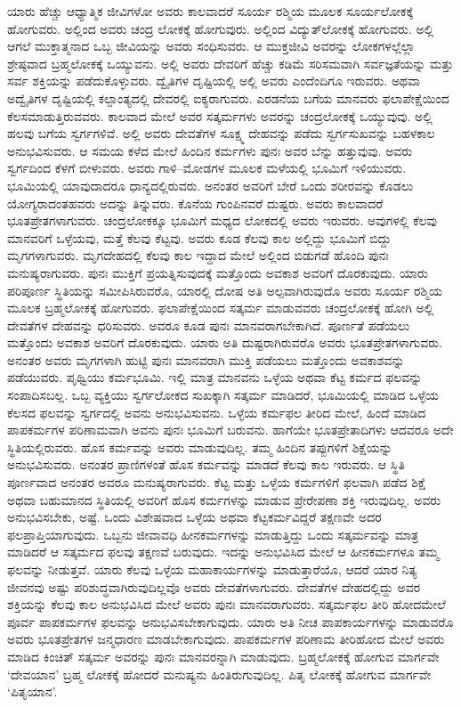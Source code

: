 ಯಾರು ಹೆಚ್ಚು ಆಧ್ಯಾತ್ಮಿಕ ಜೀವಿಗಳೋ ಅವರು ಕಾಲವಾದರೆ ಸೂರ್ಯ ರಶ್ಮಿಯ ಮೂಲಕ ಸೂರ್ಯಲೋಕಕ್ಕೆ ಹೋಗುವರು. ಅಲ್ಲಿಂದ ಅವರು ಚಂದ್ರ ಲೋಕಕ್ಕೆ ಹೋಗುವುರು. ಅಲ್ಲಿಂದ ವಿದ್ಯುತ್​ಲೋಕಕ್ಕೆ ಹೋಗುವರು. ಅಲ್ಲಿ ಆಗಲೆ ಮುಕ್ತಾತ್ಮನಾದ ಒಬ್ಬ ಜೀವಿಯನ್ನು ಅವರು ಸಂಧಿಸುವರು. ಆ ಮುಕ್ತಜೀವಿ ಅವರನ್ನು ಲೋಕಗಳಲ್ಲೆಲ್ಲಾ ಶ್ರೇಷ್ಠವಾದ ಬ್ರಹ್ಮಲೋಕಕ್ಕೆ ಒಯ್ಯುವನು. ಅಲ್ಲಿ ಅವರು ದೇವರಿಗೆ ಹೆಚ್ಚು ಕಡಿಮೆ ಸರಿಸಮವಾಗಿ ಸರ್ವಜ್ಞತೆಯನ್ನು ಮತ್ತು ಸರ್ವ ಶಕ್ತಿಯನ್ನು ಪಡೆದುಕೊಳ್ಳುವರು. ದ್ವೈತಿಗಳ ದೃಷ್ಟಿಯಲ್ಲಿ ಅಲ್ಲಿ ಅವರು ಎಂದೆಂದಿಗೂ ಇರುವರು. ಅಥವಾ ಅದ್ವೈತಿಗಳ ದೃಷ್ಟಿಯಲ್ಲಿ ಕಲ್ಪಾಂತ್ಯದಲ್ಲಿ ದೇವರಲ್ಲಿ ಐಕ್ಯರಾಗುವರು. ಎರಡನೆಯ ಬಗೆಯ ಮಾನವರು ಫಲಾಪೇಕ್ಷೆಯಿಂದ ಕೆಲಸಮಾಡುತ್ತಿರುವವರು. ಕಾಲವಾದ ಮೇಲೆ ಅವರ ಸತ್ಕರ್ಮಗಳು ಅವರನ್ನು ಚಂದ್ರಲೋಕಕ್ಕೆ ಒಯ್ಯುವುವು. ಅಲ್ಲಿ ಹಲವು ಬಗೆಯ ಸ್ವರ್ಗಗಳಿವೆ. ಅಲ್ಲಿ ಅವರು ದೇವತೆಗಳ ಸೂಕ್ಷ್ಮ ದೇಹವನ್ನು ಪಡೆದು ಸ್ವರ್ಗಸುಖವನ್ನು ಬಹಳಕಾಲ ಅನುಭವಿಸುವರು. ಆ ಸಮಯ ಕಳೆದ ಮೇಲೆ ಹಿಂದಿನ ಕರ್ಮಗಳು ಪುನಃ ಅವರ ಬೆನ್ನು ಹತ್ತುವುವು. ಅವರು ಸ್ವರ್ಗದಿಂದ ಕೆಳಗೆ ಬೀಳುವರು. ಅವರು ಗಾಳಿ–ಮೋಡಗಳ ಮೂಲಕ ಮಳೆಯಲ್ಲಿ ಭೂಮಿಗೆ ಇಳಿಯುವರು. ಭೂಮಿಯಲ್ಲಿ ಯಾವುದಾದರೂ ಧಾನ್ಯದಲ್ಲಿರುವರು. ಅನಂತರ ಅವರಿಗೆ ಬೇರೆ ಒಂದು ಶರೀರವನ್ನು ಕೊಡಲು ಯೋಗ್ಯರಾದಂತಹವರು ಅದನ್ನು ತಿನ್ನುವರು. ಕೊನೆಯ ಗುಂಪಿನವರೆ ದುಷ್ಟರು. ಅವರು ಕಾಲವಾದರೆ ಭೂತಪ್ರೇತಗಳಾಗುವರು. ಚಂದ್ರಲೋಕಕ್ಕೂ ಭೂಮಿಗೆ ಮಧ್ಯದ ಲೋಕದಲ್ಲಿ ಅವರು ಇರುವರು. ಅವುಗಳಲ್ಲಿ ಕೆಲವು ಮಾನವರಿಗೆ ಒಳ್ಳೆಯವು, ಮತ್ತೆ ಕೆಲವು ಕೆಟ್ಟವು. ಅವರು ಕೂಡ ಕೆಲವು ಕಾಲ ಅಲ್ಲಿದ್ದು ಭೂಮಿಗೆ ಬಿದ್ದು ಮೃಗಗಳಾಗುವರು. ಮೃಗದೇಹದಲ್ಲಿ ಕೆಲವು ಕಾಲ ಇದ್ದಾದ ಮೇಲೆ ಅಲ್ಲಿಂದ ಬಿಡುಗಡೆ ಹೊಂದಿ ಪುನಃ ಮನುಷ್ಯರಾಗುವರು. ಪುನಃ ಮುಕ್ತಿಗೆ ಪ್ರಯತ್ನಿಸುವುದಕ್ಕೆ ಮತ್ತೊಂದು ಅವಕಾಶ ಅವರಿಗೆ ದೊರಕುವುದು. ಯಾರು ಪರಿಪೂರ್ಣ ಸ್ಥಿತಿಯನ್ನು ಸಮೀಪಿಸಿರುವರೊ, ಯಾರಲ್ಲಿ ದೋಷ ಅತಿ ಅಲ್ಪವಾಗಿರುವುದೊ ಅವರು ಸೂರ್ಯ ರಶ್ಮಿಯ ಮೂಲಕ ಬ್ರಹ್ಮಲೋಕಕ್ಕೆ ಹೋಗುವರು. ಫಲಾಪೇಕ್ಷೆಯಿಂದ ಸತ್ಕರ್ಮ ಮಾಡುವವರು ಚಂದ್ರಲೋಕಕ್ಕೆ ಹೋಗಿ ಅಲ್ಲಿ ದೇವತೆಗಳ ದೇಹವನ್ನು ಧರಿಸುವರು. ಅವರೂ ಕೂಡ ಪುನಃ ಮಾನವರಾಗಬೇಕಾಗಿದೆ. ಪೂರ್ಣತೆ ಪಡೆಯಲು ಮತ್ತೊಂದು ಅವಕಾಶ ಅವರಿಗೆ ದೊರಕುವುದು. ಯಾರು ಅತಿ ದುಷ್ಟರಾಗಿರುವರೊ ಅವರು ಭೂತಪ್ರೇತಗಳಾಗುವರು. ಅನಂತರ ಅವರು ಮೃಗಗಳಾಗಿ ಹುಟ್ಟಿ ಪುನಃ ಮಾನವರಾಗಿ ಮುಕ್ತಿ ಪಡೆಯಲು ಮತ್ತೊಂದು ಅವಕಾಶವನ್ನು ಪಡೆಯುವರು. ಪೃಥ್ವಿಯು ಕರ್ಮಭೂಮಿ. ಇಲ್ಲಿ ಮಾತ್ರ ಮಾನವನು ಒಳ್ಳೆಯ ಅಥವಾ ಕೆಟ್ಟ ಕರ್ಮದ ಫಲವನ್ನು ಸಂಪಾದಿಸಬಲ್ಲ. ಒಬ್ಬ ವ್ಯಕ್ತಿಯು ಸ್ವರ್ಗಲೋಕದ ಸುಖಕ್ಕಾಗಿ ಸತ್ಕರ್ಮ ಮಾಡಿದರೆ, ಭೂಮಿಯಲ್ಲಿ ಮಾಡಿದ ಒಳ್ಳೆಯ ಕೆಲಸದ ಫಲವನ್ನು ಸ್ವರ್ಗದಲ್ಲಿ ಅವನು ಅನುಭವಿಸುವನು. ಒಳ್ಳೆಯ ಕರ್ಮಫಲ ತೀರಿದ ಮೇಲೆ, ಹಿಂದೆ ಮಾಡಿದ ಪಾಪಕರ್ಮಗಳ ಪರಿಣಾಮವಾಗಿ ಅವನು ಪುನಃ ಭೂಮಿಗೆ ಬರುವನು. ಹಾಗೆಯೇ ಭೂತಪ್ರೇತಾದಿಗಳು ಆದವರೂ ಅದೇ ಸ್ಥಿತಿಯಲ್ಲಿರುವರು. ಹೊಸ ಕರ್ಮವನ್ನು ಅವರು ಮಾಡುವುದಿಲ್ಲ. ತಮ್ಮ ಹಿಂದಿನ ತಪ್ಪುಗಳಿಗೆ ಶಿಕ್ಷೆಯನ್ನು ಅನುಭವಿಸುವರು. ಅನಂತರ ಪ್ರಾಣಿಗಳಂತೆ ಹೊಸ ಕರ್ಮವನ್ನು ಮಾಡದೆ ಕೆಲವು ಕಾಲ ಇರುವರು. ಆ ಸ್ಥಿತಿ ಪೂರ್ಣವಾದ ಅನಂತರ ಅವರೂ ಮನುಷ್ಯರಾಗುವರು. ಕೆಟ್ಟ ಮತ್ತು ಒಳ್ಳೆಯ ಕರ್ಮಗಳಿಗೆ ಫಲವಾಗಿ ಪಡೆದ ಶಿಕ್ಷೆ ಅಥವಾ ಬಹುಮಾನದ ಸ್ಥಿತಿಯಲ್ಲಿ ಅವರಿಗೆ ಹೊಸ ಕರ್ಮಗಳನ್ನು ಮಾಡುವ ಪ್ರೇರೇಪಣಾ ಶಕ್ತಿ ಇರುವುದಿಲ್ಲ. ಅವರು ಅನುಭವಿಸಬೇಕು, ಅಷ್ಟೆ. ಒಂದು ವಿಶೇಷವಾದ ಒಳ್ಳೆಯ ಅಥವಾ ಕೆಟ್ಟಕರ್ಮವಿದ್ದರೆ ತಕ್ಷಣವೇ ಅದರ ಫಲಪ್ರಾಪ್ತಿಯಾಗುವುದು. ಒಬ್ಬನು ಜೀವಾವಧಿ ಹೀನಕರ್ಮಗಳನ್ನು ಮಾಡುತ್ತಿದ್ದು ಒಂದು ಸತ್ಕರ್ಮವನ್ನು ಮಾತ್ರ ಮಾಡಿದರೆ ಆ ಸತ್ಕರ್ಮದ ಫಲವು ತಕ್ಷಣವೆ ಬರುವುದು. ಇದನ್ನು ಅನುಭವಿಸಿದ ಮೇಲೆ ಆ ಹೀನಕರ್ಮಗಳೂ ತಮ್ಮ ಫಲವನ್ನು ನೀಡುತ್ತವೆ. ಯಾರು ಕೆಲವು ಒಳ್ಳೆಯ ಮಹಾಕಾರ್ಯಗಳನ್ನು ಮಾಡುತ್ತಾರೆಯೊ, ಆದರೆ ಯಾರ ನಿತ್ಯ ಜೀವನವು ಅಷ್ಟು ಪರಿಶುದ್ಧವಾಗಿರುವುದಿಲ್ಲವೊ ಅವರು ದೇವತೆಗಳಾಗುವರು. ದೇವತೆಗಳ ದೇಹದಲ್ಲಿದ್ದು ಅವರ ಶಕ್ತಿಯನ್ನು ಕೆಲವು ಕಾಲ ಅನುಭವಿಸಿದ ಮೇಲೆ ಅವರು ಪುನಃ ಮಾನವರಾಗುವರು. ಸತ್ಕರ್ಮಫಲ ತೀರಿ ಹೋದಮೇಲೆ ಪೂರ್ವ ಪಾಪಕರ್ಮಗಳ ಫಲವನ್ನು ಅನುಭವಿಸಬೇಕಾಗುವುದು. ಯಾರು ಅತಿ ನೀಚ ಪಾಪಕಾರ್ಯಗಳನ್ನು ಮಾಡುವರೊ ಅವರು ಭೂತಪ್ರೇತಗಳ ಜನ್ಮಧಾರಣ ಮಾಡಬೇಕಾಗುವುದು. ಪಾಪಕರ್ಮಗಳ ಪರಿಣಾಮ ತೀರಿಹೋದ ಮೇಲೆ ಅವರು ಮಾಡಿದ ಕಿಂಚಿತ್​ ಸತ್ಕರ್ಮ ಅವರನ್ನು ಪುನಃ ಮಾನವರನ್ನಾಗಿ ಮಾಡುವುದು. ಬ್ರಹ್ಮಲೋಕಕ್ಕೆ ಹೋಗುವ ಮಾರ್ಗವೇ ‘ದೇವಯಾನ’ ಬ್ರಹ್ಮ ಲೋಕಕ್ಕೆ ಹೋದರೆ ಮನುಷ್ಯನು ಹಿಂತಿರುಗುವುದಿಲ್ಲ. ಪಿತೃ ಲೋಕಕ್ಕೆ ಹೋಗುವ ಮಾರ್ಗವೇ ‘ಪಿತೃಯಾನ’.

